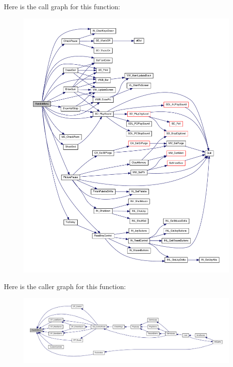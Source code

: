 Here is the call graph for this function:
\nopagebreak
\begin{figure}[H]
\begin{center}
\leavevmode
\includegraphics[width=400pt]{WL__MENU_8C_ad290f8e33560355805666460ffa302b0_cgraph}
\end{center}
\end{figure}




Here is the caller graph for this function:
\nopagebreak
\begin{figure}[H]
\begin{center}
\leavevmode
\includegraphics[width=400pt]{WL__MENU_8C_ad290f8e33560355805666460ffa302b0_icgraph}
\end{center}
\end{figure}


